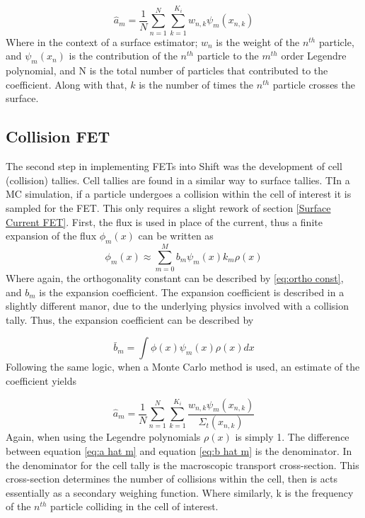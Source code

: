 \documentclass[10tma4paper]{article}
\begin{document}
	 \begin{equation} \label{eq:a hat m}
	 \hat{a}_{m}=\frac{1}{N}\sum_{n=1}^{N}\sum_{k=1}^{K_{i}}w_{n,k}\psi_{m}(x_{n,k})
	 \end{equation}
Where in the context of a surface estimator; $w_{n}$ is the weight of the $n^{th}$ particle, and $\psi_{m}(x_{n})$ is the contribution of the $n^{th}$ particle to the $m^{th}$ order Legendre polynomial, and N is the total number of particles that contributed to the coefficient. Along with that, $k$ is the number of times the $n^{th}$ particle crosses the surface.

\subsection{Collision FET}\label{Cell Tally}
The second step in implementing FETs into Shift was the development of cell (collision)  tallies. Cell tallies are found in a similar way to surface tallies. TIn a MC simulation, if a particle undergoes a collision within the cell of interest it is sampled for the FET. This only requires a slight rework of section \eqref{Surface Current FET}. First, the flux is used in place of the current, thus a finite expansion of the flux $\phi_{m}(x)$ can be written as
\begin{equation}
\phi_{m}(x) \approx \sum_{m=0}^{M}b_{m}\psi_{m}(x)k_{m}\rho(x)
\end{equation}
Where again, the orthogonality constant can be described by \eqref{eq:ortho const}, and $b_{m}$ is the expansion coefficient. The expansion coefficient is described in a slightly different manor, due to the underlying physics involved with a collision tally. Thus, the expansion coefficient can be described by

 \begin{equation} \label{eq:b bar m}
 \bar{b}_{m}=\int \phi(x)\psi_{m}(x)\rho(x)dx
 \end{equation}
Following the same logic, when a Monte Carlo method is used, an estimate of the coefficient yields

	 \begin{equation} \label{eq:b hat m}
	 \hat{a}_{m}=\frac{1}{N}\sum_{n=1}^{N}\sum_{k=1}^{K_{i}}\frac{w_{n,k}\psi_{m}(x_{n,k})}{\Sigma_{t}(x_{n,k})}
	 \end{equation}
Again, when using the Legendre polynomials 
$\rho(x)$ is simply 1. The difference between equation \ref{eq:a hat m} and equation \eqref{eq:b hat m} is the denominator. In the denominator for the cell tally is the macroscopic transport cross-section. This cross-section determines the number of collisions within the cell, then is acts essentially as a secondary weighing function. Where similarly, k is the frequency of the $n^{th}$ particle colliding in the cell of interest.
\end{document}
